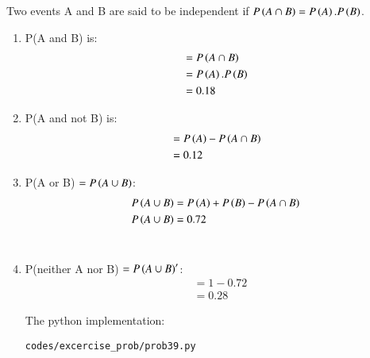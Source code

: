 \renewcommand{\theequation}{\theenumi}

\begin{theorem}
Two events A and B are said to be independent if $P\left(A \cap B\right) = P\left(A\right).P\left(B\right)$.
\end{theorem}

\begin{enumerate}

\item P(A and B) is:
\begin{align}
&=P\left(A \cap B\right)\\
&=P\left(A\right).P\left(B\right)\\
&= 0.18
\end{align}

\item P(A and not B) is:
\begin{align}
&=P\left(A\right) - P\left(A \cap B\right) \\
&= 0.12
\end{align}

\item P(A or B) $=P\left(A \cup B\right)$:
\begin{align}
P\left(A \cup B\right) &= P\left(A\right) + P\left(B\right) - P\left(A \cap B\right)\\
P\left(A \cup B\right) &= 0.72
\end{align}\\

\item P(neither A nor B) $=P\left(A \cup B\right)'$:
\begin{align}
&= 1 - 0.72\\ 
&= 0.28
\end{align}

The python implementation:
\begin{lstlisting}
codes/excercise_prob/prob39.py
\end{lstlisting}


\end{enumerate}
